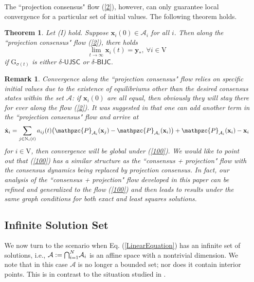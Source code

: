 \documentclass[a4paper, 11pt]{article}
\newcommand*\mcap{\mathbin{\mathpalette\mcapinn\relax}}
\newcommand*\mcapinn[2]{\vcenter{\hbox{$\mathsurround=0pt
  \ifx\displaystyle#1\textstyle\else#1\fi\bigcap$}}}
\newtheorem{theorem}{Theorem}
\newtheorem{remark}{Remark}
\begin{document}
The ``projection consensus" flow (\ref{2}), however, can only guarantee local convergence for a particular set of initial values. The following theorem holds.
\begin{theorem}\label{thm2}
Let (I) hold. Suppose $\mathbf{x}_i(0)\in \mathcal{A}_i$ for all $i$. Then  along  the  ``projection consensus" flow (\ref{2}), there holds
$$
\lim_{t\to \infty} \mathbf{x}_i(t)=\mathbf{y}_\ast,\ \forall i\in\mathrm{V}
$$ if $\mathrm{G}_{\sigma(t)}$ is either  $\delta$-$\mathsf{UJSC}$ or $\delta$-$\mathsf{BIJC}$.
\end{theorem}


\begin{remark}
Convergence along the ``projection consensus" flow relies on specific  initial values  due to the existence of equilibriums other than the desired consensus states within the set $\mathcal{A}$: if $\mathbf{x}_i(0)$ are all equal, then obviously they will stay there for ever along the flow (\ref{2}). It was suggested in \cite{brian15} that one can add another term in the ``projection consensus" flow and arrive at
\begin{align}\label{100}
 \dot{\mathbf{x}}_i =  \sum_{j\in \mathrm{N}_i(t)}a_{ij}(t)\big(\mathpzc{P}_{\mathcal{A}_i}(\mathbf{x}_j)-\mathpzc{P}_{\mathcal{A}_i}(\mathbf{x}_i)\big) + \mathpzc{P}_{\mathcal{A}_i}(\mathbf{x}_i)-\mathbf{x}_i
\end{align}
for $i\in\mathrm{V}$, then convergence will be global under (\ref{100}). We would like to point out that (\ref{100}) has a similar structure  as the ``consensus + projection" flow with the consensus dynamics being replaced by projection consensus.  In fact, our analysis of the ``consensus + projection" flow developed  in  this paper can be refined and generalized to  the flow (\ref{100}) and then leads to  results under the same graph conditions for both exact and least squares solutions.
\end{remark}

\subsection{Infinite  Solution Set}
We now turn to the scenario when Eq. (\ref{LinearEquation}) has an infinite set of  solutions, i.e., $\mathcal{A}:= \mcap_{i=1}^N\mathcal{A}_i$ is an affine space with a nontrivial dimension. We note that in this case $\mathcal{A}$ is no longer a bounded set; nor does it contain interior points. This is in contrast to the situation studied in \cite{nedic10,shitac}.
\end{document}
